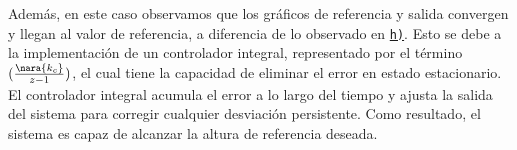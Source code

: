 Además, en este caso observamos que los gráficos de referencia y salida 
convergen y llegan al valor de referencia, a diferencia de lo observado en 
\hyperref[pregunta-h]{\texttt{h)}}. Esto se debe a la implementación de un 
controlador integral, representado por el término $(\frac{\nara{k_c}}{z-1}
)$, el cual tiene la capacidad de eliminar el error en estado 
estacionario. El controlador integral acumula el error a lo largo del tiempo y 
ajusta la salida del sistema para corregir cualquier desviación persistente. 
Como resultado, el sistema es capaz de alcanzar la altura de referencia deseada.

